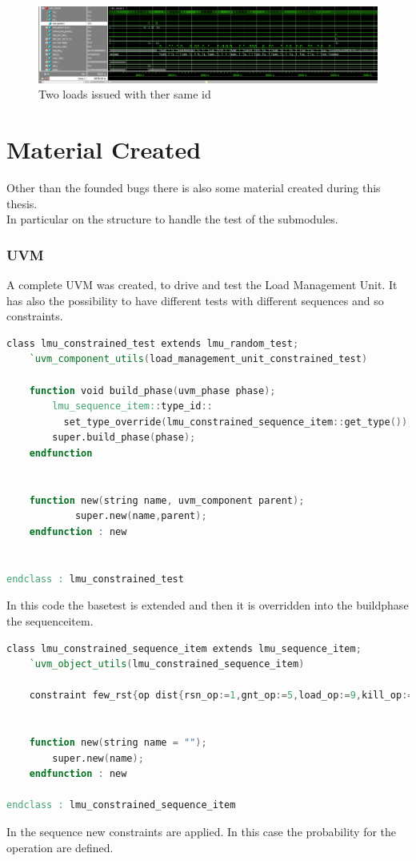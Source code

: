 \begin{figure}[H]
    \centering
    \includegraphics[scale = 0.25]{Chapter_3/img/2-loads.png}
    \caption{Two loads issued with ther same id}
    \label{2-loads}
\end{figure}

\section{Material Created}
Other than the founded bugs there is also some material created during this thesis.\\
In particular on the structure to handle the test of the submodules.\\

\subsubsection{UVM}
A complete UVM was created, to drive and test the Load Management Unit. It has also the possibility to have different tests with different sequences and so constraints.\\

\linespread{1}
\begin{lstlisting}[language=Verilog,style=verilog-style, backgroundcolor=\color{lyel_palette}, frame=tlb]
class lmu_constrained_test extends lmu_random_test;
    `uvm_component_utils(load_management_unit_constrained_test)

	function void build_phase(uvm_phase phase);
		lmu_sequence_item::type_id::
		  set_type_override(lmu_constrained_sequence_item::get_type());
		super.build_phase(phase);
	endfunction


	function new(string name, uvm_component parent);
      		super.new(name,parent);
   	endfunction : new


endclass : lmu_constrained_test
\end{lstlisting}
\linespread{1.2}
In this code the base\+test is extended and then it is overridden into the build\+phase the sequence\+item.\\
\linespread{1}
\begin{lstlisting}[language=Verilog,style=verilog-style, backgroundcolor=\color{lyel_palette}, frame=tlb]
class lmu_constrained_sequence_item extends lmu_sequence_item;
	`uvm_object_utils(lmu_constrained_sequence_item)

	constraint few_rst{op dist{rsn_op:=1,gnt_op:=5,load_op:=9,kill_op:=2};}
	

	function new(string name = "");
		super.new(name);
	endfunction : new

endclass : lmu_constrained_sequence_item
\end{lstlisting}
\linespread{1.2}
In the sequence new constraints are applied. In this case the probability for the operation are defined.\\

